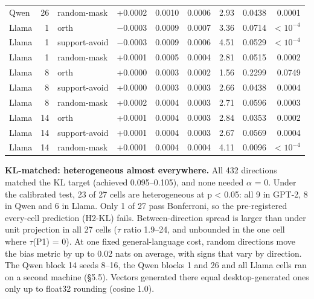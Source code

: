 \documentclass[
  10pt,
]{article}
\newcounter{none} %
\begin{document}
{\begin{longtable}[]{@{}lrlrrrrrr@{}}
Qwen & 26 & random-mask & +0.0002 & 0.0010 & 0.0006 & 2.93 & 0.0438 &
0.0001 \\
Llama & 1 & orth & $-$0.0003 & 0.0009 & 0.0007 & 3.36 & 0.0714 &
\textless{} $10^{-4}$ \\
Llama & 1 & support-avoid & $-$0.0003 & 0.0009 & 0.0006 & 4.51 & 0.0529 &
\textless{} $10^{-4}$ \\
Llama & 1 & random-mask & +0.0001 & 0.0005 & 0.0004 & 2.81 & 0.0515 &
0.0002 \\
Llama & 8 & orth & +0.0000 & 0.0003 & 0.0002 & 1.56 & 0.2299 & 0.0749 \\
Llama & 8 & support-avoid & +0.0000 & 0.0003 & 0.0003 & 2.66 & 0.0438 &
0.0004 \\
Llama & 8 & random-mask & +0.0002 & 0.0004 & 0.0003 & 2.71 & 0.0596 &
0.0003 \\
Llama & 14 & orth & +0.0001 & 0.0004 & 0.0003 & 2.84 & 0.0353 &
0.0002 \\
Llama & 14 & support-avoid & +0.0001 & 0.0004 & 0.0003 & 2.67 & 0.0569 &
0.0004 \\
Llama & 14 & random-mask & +0.0001 & 0.0004 & 0.0004 & 4.11 & 0.0096 &
\textless{} $10^{-4}$ \\
\end{longtable}
}

\textbf{KL-matched: heterogeneous almost everywhere.} All 432 directions
matched the KL target (achieved 0.095--0.105), and none needed $\alpha$ = 0.
Under the calibrated test, 23 of 27 cells are heterogeneous at p
\textless{} 0.05: all 9 in GPT-2, 8 in Qwen and 6 in Llama. Only 1 of 27
pass Bonferroni, so the pre-registered every-cell prediction (H2-KL)
fails. Between-direction spread is larger than under unit projection in
all 27 cells ($\tau$ ratio 1.9--24, and unbounded in the one cell where $\tau$(P1)
= 0). At one fixed general-language cost, random directions move the
bias metric by up to 0.02 nats on average, with signs that vary by
direction. The Qwen block 14 seeds 8--16, the Qwen blocks 1 and 26 and
all Llama cells ran on a second machine (§5.5). Vectors generated there
equal desktop-generated ones only up to float32 rounding (cosine 1.0).
\end{document}
